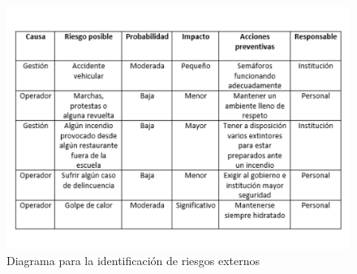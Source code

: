     \begin{figure}[H]
        \centering
        \includegraphics[scale=0.25]{30/img/PosiblesRiesgosExt.pdf}
        \caption{Diagrama para la identificación de riesgos externos}
    \end{figure}
